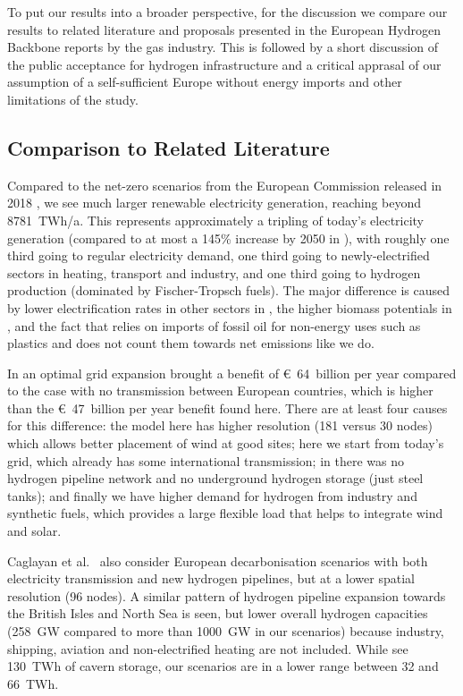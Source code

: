 To put our results into a broader perspective, for the discussion we compare our
results to related literature and proposals presented in the European Hydrogen
Backbone reports by the gas industry. This is followed by a short discussion of
the public acceptance for hydrogen infrastructure and a critical apprasal of our
assumption of a self-sufficient Europe without energy imports and other
limitations of the study.

\subsection*{Comparison to Related Literature}

Compared to the net-zero scenarios from the European Commission released in 2018
\cite{in-depth_2018}, we see much larger renewable electricity generation, reaching beyond
8781~TWh/a. This represents approximately a tripling
of today's electricity generation (compared to at most a 145\% increase by 2050
in \cite{in-depth_2018}), with roughly one third going to regular electricity
demand, one third going to newly-electrified sectors in heating, transport and
industry, and one third going to hydrogen production (dominated by
Fischer-Tropsch fuels). The major difference is caused by lower electrification
rates in other sectors in \cite{in-depth_2018}, the higher biomass potentials in
\cite{in-depth_2018}, and the fact that \cite{in-depth_2018} relies on imports
of fossil oil for non-energy uses such as plastics and does not count them
towards net emissions like we do.

In \cite{brownSynergiesSector2018} an optimal grid expansion brought a benefit
of \euro~64~billion per year compared to the case with no transmission between
European countries, which is higher than the \euro~47~billion per year benefit
found here. There are at least four causes for this difference: the model here
has higher resolution (181 versus 30 nodes) which allows better placement of
wind at good sites; here we start from today's grid, which already has some
international transmission; in \cite{brownSynergiesSector2018} there was no
hydrogen pipeline network and no underground hydrogen storage (just steel
tanks); and finally we have higher demand for hydrogen from industry and
synthetic fuels, which provides a large flexible load that helps to integrate
wind and solar.

Caglayan et al.~\cite{Caglayan2019} also consider European decarbonisation
scenarios with both electricity transmission and new hydrogen pipelines, but at
a lower spatial resolution (96 nodes). A similar pattern of hydrogen pipeline
expansion towards the British Isles and North Sea is seen, but lower overall
hydrogen capacities (258~GW compared to more than 1000~GW in our scenarios)
because industry, shipping, aviation and non-electrified heating are not
included. While \cite{Caglayan2019} see 130~TWh of cavern storage, our scenarios
are in a lower range between 32 and 66~TWh.

